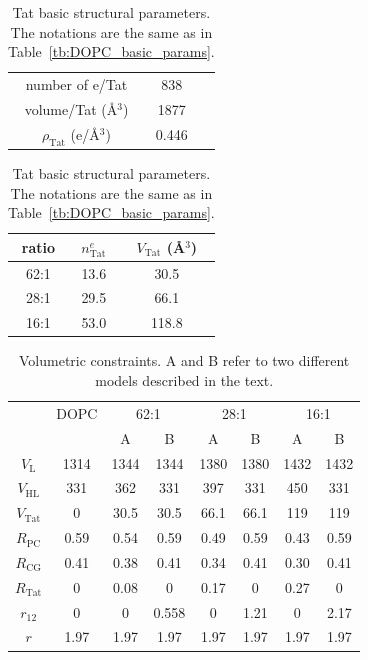 \documentclass[12pt,letterpaper]{article}
\newcommand{\VHL}{V_\textrm{HL}}
\newcommand{\VL}{V_\textrm{L}}
\newcommand{\VTat}{V_\textrm{Tat}}
\newcommand{\RPC}{R_\textrm{PC}}
\newcommand{\RCG}{R_\textrm{CG}}
\newcommand{\RTat}{R_\textrm{Tat}}
\begin{document}
\begin{table}[htbp]
  \centering
  \begin{tabular}{ ccc }
    \hline
    number of e/Tat & 838 \\ 
    volume/Tat (\AA$^3$) & 1877 \\
    $\rho_\textrm{Tat}$ (e/\AA$^3$) & 0.446 \\
    \hline
  \end{tabular}
  \quad
  \begin{tabular}{ ccc }
    \hline
    ratio & $n^e_\textrm{Tat}$ & $\VTat$ (\AA$^3$) \\    
    \hline
    62:1 & 13.6 & 30.5 \\
    28:1 & 29.5 & 66.1 \\
    16:1 & 53.0 & 118.8 \\
    \hline
  \end{tabular}
  \caption{Tat basic structural parameters. The notations are the same
  as in Table~\ref{tb:DOPC_basic_params}.}
  \label{tb:Tat_basic_params}
\end{table}
\begin{table}[htbp]
  \centering
  \begin{tabular}{ |c|c|c|c|c|c|c|c| }
    \hline
     & DOPC & \multicolumn{2}{c|}{62:1} & \multicolumn{2}{c|}{28:1} & \multicolumn{2}{c|}{16:1} \\
    \cline{3-8}
     & & A & B & A & B & A & B \\
    \hline
    $\VL$ & 1314 & 1344 & 1344 & 1380 & 1380 & 1432 & 1432 \\    
    $\VHL$ & 331 & 362 & 331 & 397 & 331 & 450 & 331 \\  
    $\VTat$ & 0 & 30.5 & 30.5 & 66.1 & 66.1 & 119 & 119 \\  
    $\RPC$ & 0.59 & 0.54 & 0.59 & 0.49 & 0.59 & 0.43 & 0.59 \\
    $\RCG$ & 0.41 & 0.38 & 0.41 & 0.34 & 0.41 & 0.30 & 0.41 \\
    $\RTat$ & 0   & 0.08 & 0    & 0.17 & 0    & 0.27 & 0 \\ 
    $r_{12}$ & 0 & 0 & 0.558 & 0 & 1.21 & 0 & 2.17 \\
    $r$ & 1.97 & 1.97 & 1.97 & 1.97 & 1.97 & 1.97 & 1.97 \\ 
    \hline
  \end{tabular}
  \caption{Volumetric constraints. A and B refer to two different models 
  described in the text.}
  \label{tb:model_constraints}
\end{table}
\end{document}
